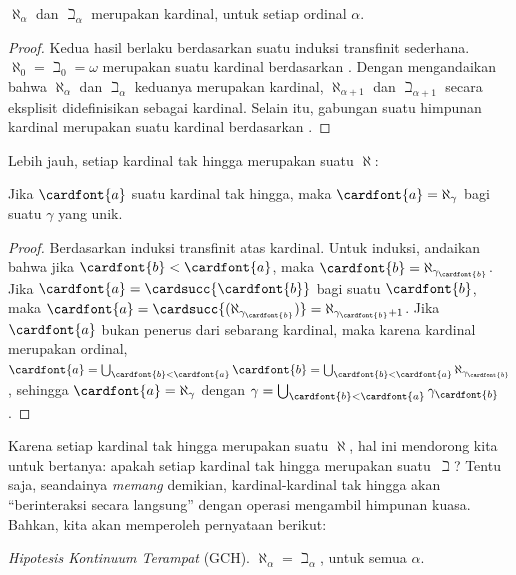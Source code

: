 \documentclass[../../../include/open-logic-section]{subfiles}
\begin{document}
\begin{prop}
$\aleph_\alpha$ dan $\beth_\alpha$ merupakan kardinal, untuk setiap ordinal
$\alpha$.
\end{prop}

\begin{proof}
Kedua hasil berlaku berdasarkan suatu induksi transfinit sederhana.
$\aleph_0 = \beth_0 = \omega$ merupakan suatu kardinal berdasarkan
. Dengan mengandaikan bahwa
$\aleph_\alpha$ dan $\beth_\alpha$ keduanya merupakan kardinal,
$\aleph_{\alpha+1}$ dan $\beth_{\alpha+1}$ secara eksplisit didefinisikan
sebagai kardinal. Selain itu, gabungan suatu himpunan kardinal merupakan suatu
kardinal berdasarkan
.
\end{proof}
\noindent
Lebih jauh, setiap kardinal tak hingga merupakan suatu $\aleph$:

\begin{prop}
Jika $\cardfont{a}$ suatu kardinal tak hingga, maka
$\cardfont{a} = \aleph_\gamma$ bagi suatu $\gamma$ yang unik.
\end{prop}

\begin{proof}
Berdasarkan induksi transfinit atas kardinal. Untuk induksi, andaikan bahwa
jika $\cardfont{b} < \cardfont{a}$, maka
$\cardfont{b} = \aleph_{\gamma_\cardfont{b}}$. Jika
$\cardfont{a} = \cardsucc{\cardfont{b}}$ bagi suatu $\cardfont{b}$, maka
$\cardfont{a} = \cardsucc{(\aleph_{\gamma_\cardfont{b}})}=
\aleph_{\gamma_\cardfont{b}+1}$. Jika $\cardfont{a}$ bukan penerus dari
sebarang kardinal, maka karena kardinal merupakan ordinal,
$\cardfont{a} = \bigcup_{\cardfont{b} < \cardfont{a}} \cardfont{b} =
\bigcup_{\cardfont{b} < \cardfont{a}}{\aleph_{\gamma_\cardfont{b}}}$,
sehingga $\cardfont{a} = \aleph_\gamma$ dengan
$\gamma = \bigcup_{\cardfont{b} < \cardfont{a}}\gamma_\cardfont{b}$.
\end{proof}

Karena setiap kardinal tak hingga merupakan suatu $\aleph$, hal ini mendorong
kita untuk bertanya: apakah setiap kardinal tak hingga merupakan
suatu~$\beth$? Tentu saja, seandainya \emph{memang} demikian, kardinal-kardinal tak
hingga akan ``berinteraksi secara langsung'' dengan operasi mengambil
himpunan kuasa. Bahkan, kita akan memperoleh pernyataan berikut:

\begin{defish}
\emph{Hipotesis Kontinuum Terampat} (GCH). $\aleph_\alpha = \beth_\alpha$,
untuk semua $\alpha$.
\end{defish}
\end{document}
